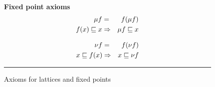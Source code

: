 \documentclass[fleqn]{fac}
\newcommand{\figurerule}{\rule{\textwidth}{0.5pt}}
\newcommand{\labelaxiom}[1]{\label{axiom-#1}\index{Axiom!#1|AxiomDef{\ref{axiom-#1}}}}
\begin{document}
\begin{figure}
\begin{minipage}{0.48\textwidth}
\vspace*{2ex}
\textbf{Fixed point axioms}
\begin{eqnarray}
  \mu f & = & f(\mu f)  \labelaxiom{least-fixed-point-unfold} \\
  f(x) \refsto x & \implies & \mu f \refsto x \labelaxiom{least-fixed-point-induction}
\end{eqnarray}
\end{minipage}
\quad
\begin{minipage}{0.48\textwidth}
\begin{eqnarray}
  \nu f & = & f(\nu f)  \labelaxiom{greatest-fixed-point-unfold} \\
  x \refsto f(x) & \implies & x \refsto \nu f  \labelaxiom{greatest-fixed-point-induction}
\end{eqnarray}
\end{minipage}

\vspace*{1ex}
\figurerule

\caption{Axioms for lattices and fixed points}\label{figure:lattices}
\end{figure}
\end{document}
